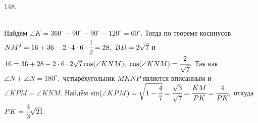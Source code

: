 148. \begin{figure}[ht!]
\end{figure}\\
Найдём $\angle K=360^\circ-90^\circ-90^\circ-120^\circ=60^\circ.$ Тогда по теореме косинусов $NM^2=16+36-2\cdot4\cdot6\cdot\cfrac{1}{2}=28,\ BD=2\sqrt{7}$ и $16=36+28-2\cdot6\cdot2\sqrt{7}\cos(\angle KNM),\ \cos(\angle KNM)=\cfrac{2}{\sqrt{7}}.$ Так как $\angle N+\angle N=180^\circ,$ четырёхугольник $MKNP$ является вписанным и $\angle KPM=\angle KNM.$ Найдём $\sin(\angle KPM)=\sqrt{1-\cfrac{4}{7}}=\cfrac{\sqrt{3}}{\sqrt{7}}=\cfrac{KM}{PK}=\cfrac{4}{PK},$ откуда $PK=\cfrac{4}{3}\sqrt{21}.$\\
